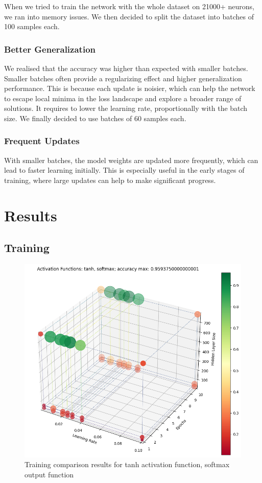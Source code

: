 \documentclass[utf8,1pt]{extarticle} %
\begin{document}
When we tried to train the network with the 
whole dataset on 21000+ neurons, 
we ran into memory issues.
We then decided to split the dataset into batches of 100 samples each.

\subsubsection{Better Generalization} 
We realised that the accuracy was higher than expected with smaller batches.
Smaller batches often provide a regularizing effect
 and higher generalization performance. 
 This is because each update is noisier, 
 which can help the network to escape 
 local minima in the loss landscape and 
 explore a broader range of solutions.
It requires to lower the learning rate, proportionally with the batch size.
We finally decided to use batches of 60 samples each.

\subsubsection{Frequent Updates} 
With smaller batches, 
the model weights are updated more frequently, 
which can lead to faster learning initially. 
This is especially useful in the early stages of training, 
where large updates can help to make significant progress.


\section{Results}
\subsection{Training}
\begin{figure}
    \centering
    \includegraphics[width=\textwidth]{media/training/results_plot_activation_functions_tanh_softmax_2023-12-29162932.png}
    \caption{Training comparison results for tanh activation function, softmax output function}
    \label{fig:comparison}
\end{figure}
\end{document}
